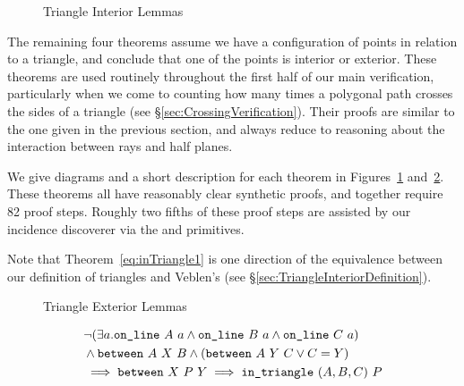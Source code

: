 \begin{figure}
\centering
{}
\qquad{}
\caption{Triangle Interior Lemmas}
\label{fig:inTriangleTheorems}
\end{figure}

The remaining four theorems assume we have a configuration of points in relation to a triangle, and conclude that one of the points is interior or exterior. These theorems are used routinely throughout the first half of our main verification, particularly when we come to counting how many times a polygonal path crosses the sides of a triangle (see \S\ref{sec:CrossingVerification}). Their proofs are similar to the one given in the previous section, and always reduce to reasoning about the interaction between rays and half planes.

We give diagrams and a short description for each theorem in Figures~\ref{fig:inTriangleTheorems} and~\ref{fig:outTriangleTheorems}. These theorems all have reasonably clear synthetic proofs, and together require 82 proof steps. Roughly two fifths of these proof steps are assisted by our incidence discoverer via the  and  primitives.

Note that Theorem~\ref{eq:inTriangle1} is one direction of the equivalence between our definition of triangles and Veblen's (see \S\ref{sec:TriangleInteriorDefinition}).

\begin{figure}
\centering{}
\qquad{}
\caption{Triangle Exterior Lemmas}
\label{fig:outTriangleTheorems}
\end{figure}

\begin{equation}\label{eq:inTriangle1}
  \begin{split}
    &\neg(\exists a.\texttt{on\_line}\ A\ a\wedge \texttt{on\_line}\ B\ a\wedge \texttt{on\_line}\ C\ a)\\
    &\wedge \texttt{between}\ A\ X\ B \wedge (\texttt{between}\ A\ Y\ C \vee C = Y)\\
    &\implies \texttt{between}\ X\ P\ Y \implies \texttt{in\_triangle}\ (A,B,C)\ P
  \end{split}
\end{equation}


